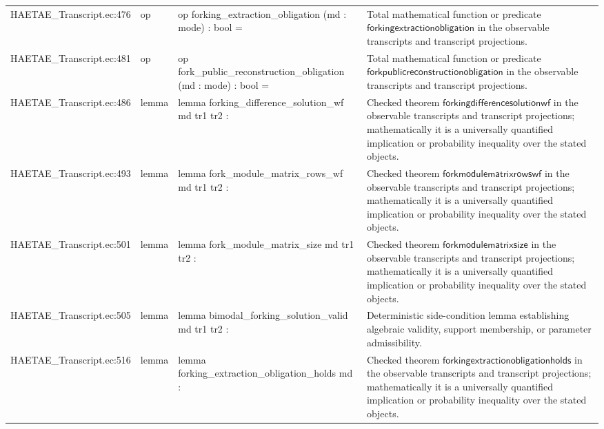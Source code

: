 \documentclass[10pt]{article}
\begin{document}
\begin{longtable}{L{0.11\textwidth}L{0.055\textwidth}L{0.385\textwidth}L{0.41\textwidth}}
HAETAE\_\allowbreak{}Transcript.\allowbreak{}ec:\allowbreak{}476 & op & {\ttfamily\scriptsize op forking\_\allowbreak{}extraction\_\allowbreak{}obligation (md : mode) : bool =} & Total mathematical function or predicate $\mathsf{forkingextractionobligation}$ in the observable transcripts and transcript projections. \\
HAETAE\_\allowbreak{}Transcript.\allowbreak{}ec:\allowbreak{}481 & op & {\ttfamily\scriptsize op fork\_\allowbreak{}public\_\allowbreak{}reconstruction\_\allowbreak{}obligation (md : mode) : bool =} & Total mathematical function or predicate $\mathsf{forkpublicreconstructionobligation}$ in the observable transcripts and transcript projections. \\
HAETAE\_\allowbreak{}Transcript.\allowbreak{}ec:\allowbreak{}486 & lemma & {\ttfamily\scriptsize lemma forking\_\allowbreak{}difference\_\allowbreak{}solution\_\allowbreak{}wf md tr1 tr2 :} & Checked theorem $\mathsf{forkingdifferencesolutionwf}$ in the observable transcripts and transcript projections; mathematically it is a universally quantified implication or probability inequality over the stated objects. \\
HAETAE\_\allowbreak{}Transcript.\allowbreak{}ec:\allowbreak{}493 & lemma & {\ttfamily\scriptsize lemma fork\_\allowbreak{}module\_\allowbreak{}matrix\_\allowbreak{}rows\_\allowbreak{}wf md tr1 tr2 :} & Checked theorem $\mathsf{forkmodulematrixrowswf}$ in the observable transcripts and transcript projections; mathematically it is a universally quantified implication or probability inequality over the stated objects. \\
HAETAE\_\allowbreak{}Transcript.\allowbreak{}ec:\allowbreak{}501 & lemma & {\ttfamily\scriptsize lemma fork\_\allowbreak{}module\_\allowbreak{}matrix\_\allowbreak{}size md tr1 tr2 :} & Checked theorem $\mathsf{forkmodulematrixsize}$ in the observable transcripts and transcript projections; mathematically it is a universally quantified implication or probability inequality over the stated objects. \\
HAETAE\_\allowbreak{}Transcript.\allowbreak{}ec:\allowbreak{}505 & lemma & {\ttfamily\scriptsize lemma bimodal\_\allowbreak{}forking\_\allowbreak{}solution\_\allowbreak{}valid md tr1 tr2 :} & Deterministic side-condition lemma establishing algebraic validity, support membership, or parameter admissibility. \\
HAETAE\_\allowbreak{}Transcript.\allowbreak{}ec:\allowbreak{}516 & lemma & {\ttfamily\scriptsize lemma forking\_\allowbreak{}extraction\_\allowbreak{}obligation\_\allowbreak{}holds md :} & Checked theorem $\mathsf{forkingextractionobligationholds}$ in the observable transcripts and transcript projections; mathematically it is a universally quantified implication or probability inequality over the stated objects. \\

\end{longtable}
\end{document}
